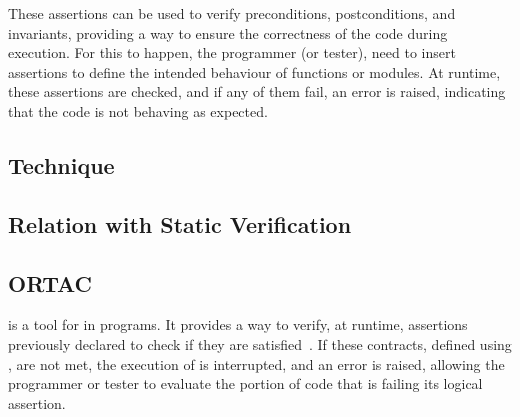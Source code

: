 These assertions can be used to verify preconditions, postconditions, and invariants, 
providing a way to ensure the correctness of the code during execution. For this to 
happen, the programmer (or tester), need to insert assertions to define the intended 
behaviour of functions or modules. At runtime, these assertions are checked, and if 
any of them fail, an error is raised, indicating that the code is not behaving as 
expected.

\subsection{Technique}
\label{sub:technique}

\subsection{Relation with Static Verification}
\label{sub:relation_with_static_verification}

\subsection{ORTAC}
\label{sub:ortac}

\ortac is a tool for \rac in \ocaml programs. It provides a way to verify, at runtime, 
assertions previously declared to check if they are satisfied~\cite{Filliatre_Jean-Christophe}. If these contracts, 
defined using \why, are not met, the execution of \ortac is interrupted, and an error 
is raised, allowing the programmer or tester to evaluate the portion of code that is 
failing its logical assertion.
